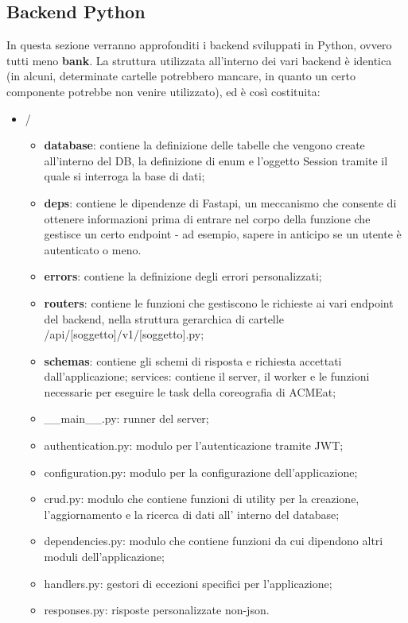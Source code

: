 \documentclass[11pt]{article} %
\begin{document}
\subsection{Backend Python}

In questa sezione verranno approfonditi i backend sviluppati in Python, ovvero tutti meno \textbf{bank}. La struttura utilizzata all'interno dei vari backend è identica (in alcuni, determinate cartelle potrebbero mancare, in quanto un certo componente potrebbe non venire utilizzato), ed è così costituita:
\begin{itemize}
\item /
\begin{itemize}
\item \textbf{database}: contiene la definizione delle tabelle che vengono create all'interno del DB, la definizione di enum e l'oggetto Session tramite il quale si interroga la base di dati;
\item \textbf{deps}: contiene le dipendenze di Fastapi, un meccanismo che consente di ottenere informazioni prima di entrare nel corpo della funzione che gestisce un certo endpoint - ad esempio, sapere in anticipo se un utente è autenticato o meno.
\item \textbf{errors}: contiene la definizione degli errori personalizzati;
\item \textbf{routers}: contiene le funzioni che gestiscono le richieste ai vari endpoint del backend, nella struttura gerarchica di cartelle /api/[soggetto]/v1/[soggetto].py;
\item \textbf{schemas}: contiene gli schemi di risposta e richiesta accettati dall'applicazione;
services: contiene il server, il worker e le funzioni necessarie per eseguire le task della coreografia di ACMEat;
\item \_\_main\_\_.py: runner del server;
\item authentication.py: modulo per l'autenticazione tramite JWT;
\item configuration.py: modulo per la configurazione dell'applicazione;
\item crud.py: modulo che contiene funzioni di utility per la creazione, l'aggiornamento e la ricerca di dati all' interno del database;
\item dependencies.py: modulo che contiene funzioni da cui dipendono altri moduli dell'applicazione;
\item handlers.py: gestori di eccezioni specifici per l'applicazione;
\item responses.py: risposte personalizzate non-json.
\end{itemize}
\end{itemize}
\end{document}
